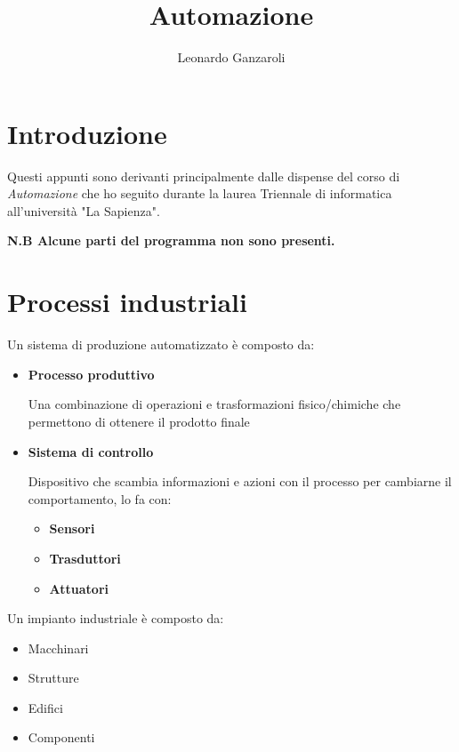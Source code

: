 \documentclass{article}
\title{Automazione}
\author{Leonardo Ganzaroli}
\date{}
\begin{document}
\maketitle


\tableofcontents

\newpage

\hypersetup{allcolors=black}

\section*{Introduzione}

Questi appunti sono derivanti principalmente dalle dispense del corso di \textit{Automazione} che ho seguito durante la laurea Triennale di informatica all'università "La Sapienza".\newline

\noindent\textbf{N.B Alcune parti del programma non sono presenti.}

\newpage

\section{Processi industriali}

Un sistema di produzione automatizzato è composto da:
\begin{itemize}
    \item \textbf{Processo produttivo}

        Una combinazione di operazioni e trasformazioni fisico/chimiche che permettono di ottenere il prodotto finale
    
    \item \textbf{Sistema di controllo}

        Dispositivo che scambia informazioni e azioni con il processo per cambiarne il comportamento, lo fa con:
            \begin{itemize}
                \item \textbf{Sensori}
                \item \textbf{Trasduttori}
                \item \textbf{Attuatori}\newline
            \end{itemize}
    
\end{itemize}

\noindent Un impianto industriale è composto da:
\begin{itemize}
    \item Macchinari
    \item Strutture
    \item Edifici
    \item Componenti\newline
\end{itemize}
\end{document}
